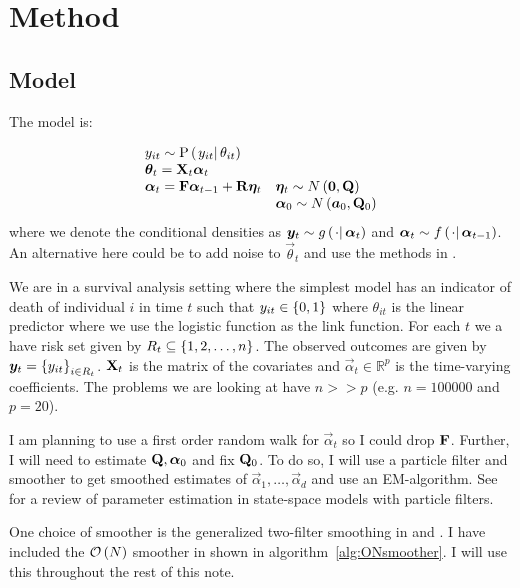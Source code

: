 \section{Method}
\subsection*{Model}
The model is:

\begin{equation}
\begin{array}{ll}
 	y_{it} \sim \propC{y_{it}}{\theta_{it}} & \\
%
 	\vec{\theta}_{t} = \mat{X}_t\vec{\alpha}_t \\
% 
 	\vec{\alpha}_t = \mat{F}\vec{\alpha}_{t - 1} + \mat{R}\vec{\eta}_t &
 		\vec{\eta}_t \sim N\Lparen{\vec{0}, \mat{Q}} \\
%
	&	\vec{\alpha}_0 \sim N\Lparen{\vec{a}_0, \mat{Q}_0}
 \end{array}
\end{equation}%
%
where we denote the conditional densities as $\vec{y}_t \sim \optorC{g}{\cdot}{\vec{\alpha}_t}$ and $\vec{\alpha}_t \sim \optorC{f}{\cdot}{\vec{\alpha}_{t-1}}$. An alternative here could be to add noise to $\vec{\theta}_{t}$ and use the methods in \cite{andrieu02}.

We are in a survival analysis setting where the simplest model has an indicator of death of individual $i$ in time $t$ such that $y_{it} \in \left\{ 0, 1\right\}$ where $\theta_{it}$ is the linear predictor where we use the logistic function as the link function. For each $t$ we a have risk set given by $R_t \subseteq \left\{ 1,2,\dots,n\right\}$. The observed outcomes are given by $\bm{y}_t = \left\{ y_{it}\right\}_{i \in R_t}$. $\mathbf{X}_t$ is the matrix of the covariates and $\vec{\alpha}_t \in \mathbb{R}^p$ is the time-varying coefficients. The problems we are looking at have $n >> p$ (e.g. $n = 100000$ and $p = 20$). 

I am planning to use a first order random walk for $\vec{\alpha}_t$ so I could drop $\mathbf{F}$. Further, I will need to estimate $\mathbf{Q}, \bm{\alpha}_0$ and fix $\mathbf{Q}_0$. To do so, I will use a particle filter and smoother to get smoothed estimates of $\vec{\alpha}_1, \dots, \vec{\alpha}_d$ and use an EM-algorithm. See \cite{kantas15} for a review of parameter estimation in state-space models with particle filters.

One choice of smoother is the generalized two-filter smoothing in \cite{fearnhead10} and \cite{briers10}. I have included the $\mathcal{O}\left( N\right)$ smoother in \cite{fearnhead10} shown in algorithm~\ref{alg:ONsmoother}. I will use this throughout the rest of this note.

